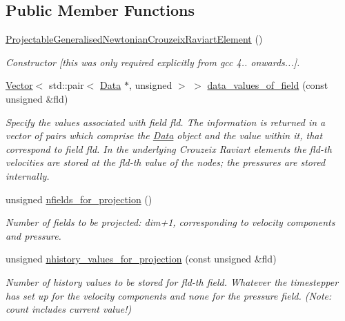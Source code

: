 \subsection*{Public Member Functions}
\begin{DoxyCompactItemize}
\item 
\hyperlink{classoomph_1_1ProjectableGeneralisedNewtonianCrouzeixRaviartElement_a54a4d4a9b1de6861d05c194c05540d11}{Projectable\+Generalised\+Newtonian\+Crouzeix\+Raviart\+Element} ()
\begin{DoxyCompactList}\small\item\em Constructor \mbox{[}this was only required explicitly from gcc 4.. onwards...\mbox{]}. \end{DoxyCompactList}\item 
\hyperlink{classoomph_1_1Vector}{Vector}$<$ std\+::pair$<$ \hyperlink{classoomph_1_1Data}{Data} $\ast$, unsigned $>$ $>$ \hyperlink{classoomph_1_1ProjectableGeneralisedNewtonianCrouzeixRaviartElement_aee4e12ec586f561d681f63dda4d1d3ce}{data\+\_\+values\+\_\+of\+\_\+field} (const unsigned \&fld)
\begin{DoxyCompactList}\small\item\em Specify the values associated with field fld. The information is returned in a vector of pairs which comprise the \hyperlink{classoomph_1_1Data}{Data} object and the value within it, that correspond to field fld. In the underlying Crouzeix Raviart elements the fld-\/th velocities are stored at the fld-\/th value of the nodes; the pressures are stored internally. \end{DoxyCompactList}\item 
unsigned \hyperlink{classoomph_1_1ProjectableGeneralisedNewtonianCrouzeixRaviartElement_a6c8b647ec31436a5f35e4eee2cd678b6}{nfields\+\_\+for\+\_\+projection} ()
\begin{DoxyCompactList}\small\item\em Number of fields to be projected\+: dim+1, corresponding to velocity components and pressure. \end{DoxyCompactList}\item 
unsigned \hyperlink{classoomph_1_1ProjectableGeneralisedNewtonianCrouzeixRaviartElement_aa1351493ce07955f66bcc56b4a2beabf}{nhistory\+\_\+values\+\_\+for\+\_\+projection} (const unsigned \&fld)
\begin{DoxyCompactList}\small\item\em Number of history values to be stored for fld-\/th field. Whatever the timestepper has set up for the velocity components and none for the pressure field. (Note\+: count includes current value!) \end{DoxyCompactList}\item 

\end{DoxyCompactItemize}
